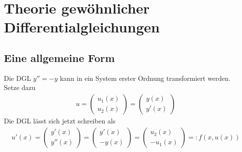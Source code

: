 \documentclass[
]{mycourse}
\begin{document}
\section{Theorie gewöhnlicher Differentialgleichungen}



\subsection{Eine allgemeine Form}


\begin{ex} \label{1.4}
	Die DGL $y'' = -y$ kann in ein System erster Ordnung transformiert werden.
	Setze dazu
	\begin{align*}
		u = \begin{pmatrix}
			u_1(x) \\ u_2(x)
		\end{pmatrix} = \begin{pmatrix}
			y(x) \\ y'(x)
		\end{pmatrix}
	\end{align*}
	Die DGL lässt sich jetzt schreiben als
	\begin{align*}
		u'(x) =
		\begin{pmatrix}
			y'(x) \\ y''(x)
		\end{pmatrix}
		= \begin{pmatrix}
			y'(x) \\ -y(x)
		\end{pmatrix}
		= \begin{pmatrix}
			u_2(x) \\ -u_1(x)
		\end{pmatrix}
		=: f(x, u(x))
	\end{align*}
\end{ex}
\end{document}
